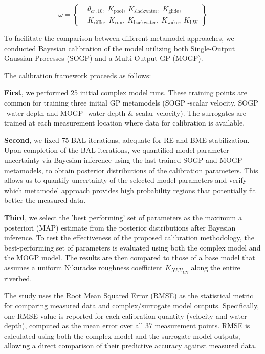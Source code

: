 \documentclass[draft,linenumbers,onecolumn]{agujournal2019} %
\begin{document}
\begin{equation}
	\omega = \left\{
	\begin{split}
		&\theta_{cr,10},\ K_{\text{pool}},\ K_{\text{slackwater}},\ K_{\text{glide}}, \\
		&K_{\text{riffle}},\ K_{\text{run}},\ K_{\text{backwater}},\ K_{\text{wake}},\ K_{\text{LW}}
	\end{split}
	\right\}
\end{equation}



To facilitate the comparison between different metamodel approaches, we conducted Bayesian calibration of the model utilizing both Single-Output Gaussian Processes (SOGP) and a Multi-Output GP (MOGP).

The calibration framework proceeds as follows:

\textbf{First}, we performed 25 initial complex model runs. These training points are common for training three initial GP metamodels (SOGP -scalar velocity, SOGP -water depth and MOGP -water depth \& scalar velocity). The surrogates are trained at each measurement location where data for calibration is available.

\textbf{Second}, we fixed 75 BAL iterations, adequate for RE and BME stabilization. Upon completion of the BAL iterations, we quantified model parameter uncertainty via Bayesian inference using the last trained SOGP and MOGP metamodels,  to obtain posterior distributions of the calibration parameters. This allows us to quantify uncertainty of the selected model parameters and verify which metamodel approach provides high probability regions that potentially fit better the measured data. 

\textbf{Third}, we select the 'best performing' set of parameters as the maximum a posteriori (MAP) estimate from the posterior distributions after Bayesian inference. To test the effectiveness of the proposed calibration methodology, the best-performing set of parameters is evaluated using both the complex model and the MOGP model. The results are then compared to those of a base model that assumes a uniform Nikuradse roughness coefficient \(K_{NKU_{UN}}\) along the entire riverbed. 

The study uses the Root Mean Squared Error (RMSE) as the statistical metric for comparing measured data and complex/surrogate model outputs. Specifically, one RMSE value is reported for each calibration quantity (velocity and water depth), computed as the mean error over all 37 measurement points. RMSE is calculated using both the complex model and the surrogate model outputs, allowing a direct comparison of their predictive accuracy against measured data.
\end{document}
